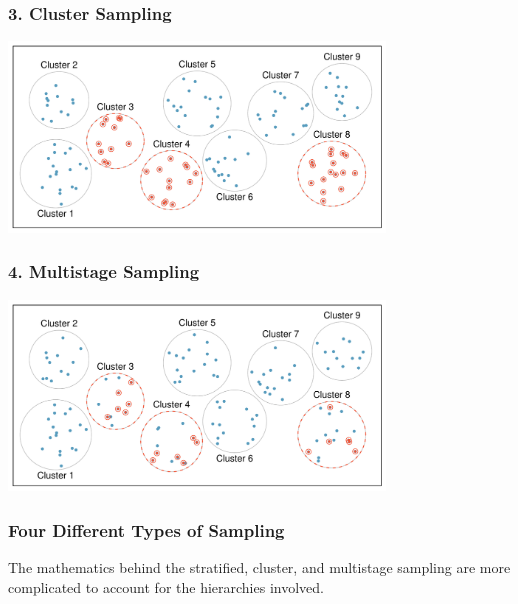 \documentclass[handout]{beamer}
\begin{document}
\begin{frame}
\frametitle{3. Cluster Sampling}

\begin{center}
\includegraphics[width=0.75\textwidth]{figure/cluster.pdf}
\end{center}

%
%
\end{frame}


\begin{frame}
\frametitle{4. Multistage Sampling}

\begin{center}
\includegraphics[width=0.75\textwidth]{figure/multistage.pdf}
\end{center}

%
%

\end{frame}


\begin{frame}
\frametitle{Four Different Types of Sampling}


The mathematics behind the stratified, cluster, and multistage sampling are more complicated to account for the hierarchies involved. 

\end{frame}
\end{document}
